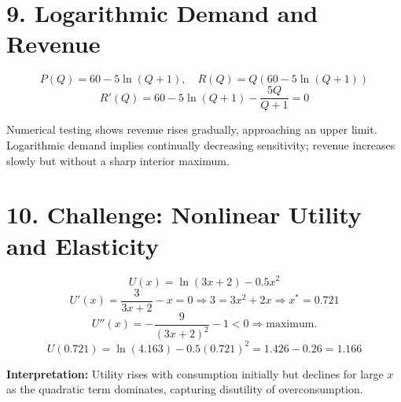 \documentclass[12pt]{article}
\begin{document}
\newpage
\section*{9. Logarithmic Demand and Revenue}

\[
P(Q)=60-5\ln(Q+1),\quad R(Q)=Q(60-5\ln(Q+1))
\]
\[
R'(Q)=60-5\ln(Q+1)-\frac{5Q}{Q+1}=0
\]

Numerical testing shows revenue rises gradually, approaching an upper limit.  
Logarithmic demand implies continually decreasing sensitivity; revenue increases slowly but without a sharp interior maximum.



\section*{10. Challenge: Nonlinear Utility and Elasticity}

\[
U(x)=\ln(3x+2)-0.5x^2
\]
\[
U'(x)=\frac{3}{3x+2}-x=0\Rightarrow3=3x^2+2x\Rightarrow x^*=0.721
\]
\[
U''(x)=-\frac{9}{(3x+2)^2}-1<0\Rightarrow\text{maximum.}
\]
\[
U(0.721)=\ln(4.163)-0.5(0.721)^2=1.426-0.26=1.166
\]

\begin{tcolorbox}
\textbf{Interpretation:} Utility rises with consumption initially but declines for large $x$ as the quadratic term dominates, capturing disutility of overconsumption.
\end{tcolorbox}
\end{document}
